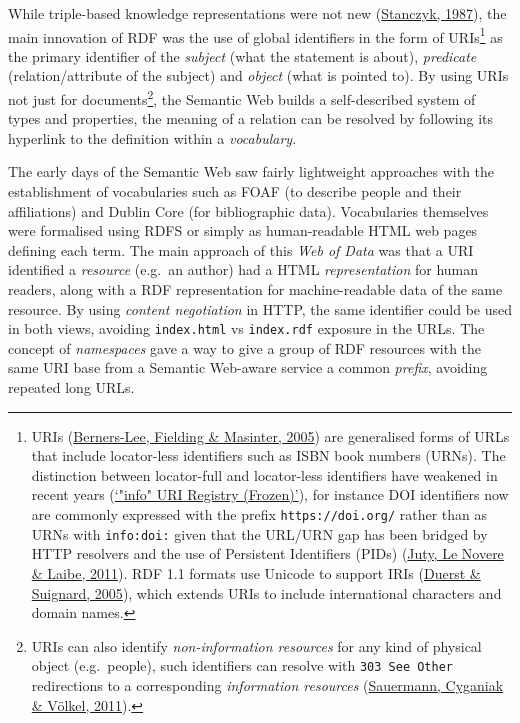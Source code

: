 While triple-based knowledge representations were not new (\protect\hyperlink{ref-NxvhwSmG}{Stanczyk, 1987}), the main innovation of RDF was the use of global identifiers in the form of URIs\footnote{URIs (\protect\hyperlink{ref-RRtwPF7Y}{Berners-Lee, Fielding \& Masinter, 2005}) are generalised forms of URLs that include locator-less identifiers
  such as ISBN book numbers (URNs). The distinction between locator-full and locator-less identifiers have weakened in recent years (\protect\hyperlink{ref-nW4HY8Nq}{{`"info" URI Registry (Frozen)'}}), for instance DOI identifiers now are commonly expressed with the prefix \texttt{https://doi.org/} rather than as URNs with \texttt{info:doi:} given that the URL/URN gap has been bridged by HTTP resolvers and the use of Persistent Identifiers (PIDs) (\protect\hyperlink{ref-HqZ3r6J3}{Juty, Le Novere \& Laibe, 2011}). RDF 1.1 formats use Unicode to support IRIs (\protect\hyperlink{ref-rqjuXkEf}{Duerst \& Suignard, 2005}), which extends URIs to include international characters and domain names.} as the primary identifier of the \emph{subject} (what the statement is about), \emph{predicate} (relation/attribute of the subject) and \emph{object} (what is pointed to). By using URIs not just for documents\footnote{URIs can also identify \emph{non-information resources} for any kind of physical object (e.g.~people), such identifiers can resolve with \texttt{303\ See\ Other} redirections to a corresponding \emph{information resources} (\protect\hyperlink{ref-rnzJ4khD}{Sauermann, Cyganiak \& Völkel, 2011}).}, the Semantic Web builds a self-described system of types and properties, the meaning of a relation can be resolved by following its hyperlink to the definition within a \emph{vocabulary}.

The early days of the Semantic Web saw fairly lightweight approaches with the establishment of vocabularies such as FOAF (to describe people and their affiliations) and Dublin Core (for bibliographic data). Vocabularies themselves were formalised using RDFS or simply as human-readable HTML web pages defining each term. The main approach of this \emph{Web of Data} was that a URI identified a \emph{resource} (e.g.~an author) had a HTML \emph{representation} for human readers, along with a RDF representation for machine-readable data of the same resource. By using \emph{content negotiation} in HTTP, the same identifier could be used in both views, avoiding \texttt{index.html} vs \texttt{index.rdf} exposure in the URLs. The concept of \emph{namespaces} gave a way to give a group of RDF resources with the same URI base from a Semantic Web-aware service a common \emph{prefix}, avoiding repeated long URLs.

